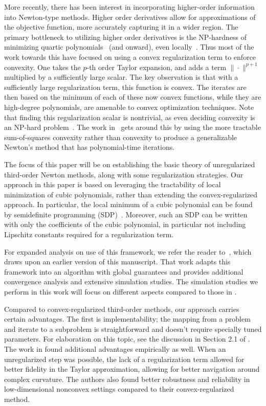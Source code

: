 \documentclass[11pt]{article}
\theoremstyle{plain}
\theoremstyle{definition}
\theoremstyle{remark}
\begin{document}
More recently, there has been interest in incorporating higher-order information into Newton-type methods. Higher order derivatives allow for approximations of the objective function, more accurately capturing it in a wider region. The primary bottleneck to utilizing higher order derivatives is the NP-hardness of minimizing quartic polynomials~\cite{murty1987some} (and onward), even locally~\cite{ahmadi2022complexityb}. Thus most of the work towards this have focused on using a convex regularization term to enforce convexity\cite{bubeck2019near,gasnikov2019optimal,nesterov2021implementable,cartis2023second,ahmadi2024higher}. One takes the $p$-th order Taylor expansion, and adds a term $\|\cdot\|^{p+1}$ multiplied by a sufficiently large scalar. The key observation is that with a sufficiently large regularization term, this function is convex. The iterates are then based on the minimum of each of these now convex functions, while they are high-degree polynomials, are amenable to convex optimization techniques. Note that finding this regularization scalar is nontrivial, as even deciding convexity is an NP-hard problem~\cite{ahmadi2013np}. The work in~\cite{ahmadi2024higher} gets around this by using the more tractable sum-of-squares convexity rather than convexity to produce a generalizable Newton's method that has polynomial-time iterations.

The focus of this paper will be on establishing the basic theory of unregularized third-order Newton methods, along with some regularization strategies. Our approach in this paper is based on leveraging the tractability of local minimization of cubic polynomials, rather than extending the convex-regularized approach. In particular, the local minimum of a cubic polynomial can be found by semidefinite programming (SDP)~\cite{ahmadi2022complexity}. Moreover, such an SDP can be written with only the coefficients of the cubic polynomial, in particular not including Lipschitz constants required for a regularization term.

For expanded analysis on use of this framework, we refer the reader to~\cite{cai2026globally}, which draws upon an earlier version of this manuscript. That work adapts this framework into an algorithm with global guarantees and provides additional convergence analysis and extensive simulation studies. The simulation studies we perform in this work will focus on different aspects compared to those in \cite{cai2026globally}.

Compared to convex-regularized third-order methods, our approach carries certain advantages. The first is implementability; the mapping from a problem and iterate to a subproblem is straightforward and doesn't require specially tuned parameters. For elaboration on this topic, see the discussion in Section 2.1 of \cite{cai2026globally}. The work in \cite{cai2026globally} found additional advantages empirically as well. When an unregularized step was possible, the lack of a regularization term allowed for better fidelity in the Taylor approximation, allowing for better navigation around complex curvature. The authors also found better robustness and reliability in low-dimensional nonconvex settings compared to their convex-regularized method.
\end{document}
